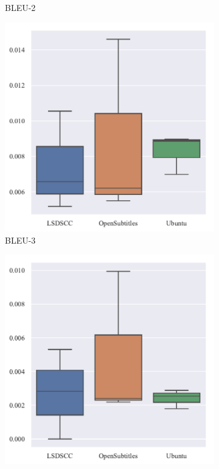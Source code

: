 \begin{figure}[H]
\begin{subfigure}{0.24\linewidth}
        \caption{BLEU-2}
    \end{subfigure}
    \begin{subfigure}{0.24\linewidth}
        \centering
        \includegraphics[width=\linewidth]{figure/boxplot/dataset/bleu_3/plot.pdf}
        \caption{BLEU-3}
    \end{subfigure}%
    \begin{subfigure}{0.24\linewidth}
        \centering
        \includegraphics[width=\linewidth]{figure/boxplot/dataset/bleu_4/plot.pdf}

\end{subfigure}
\end{figure}
